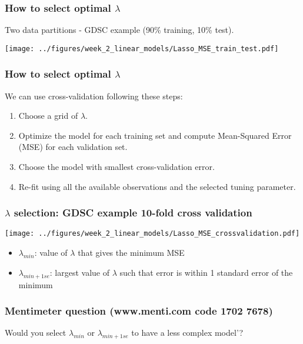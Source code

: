 \documentclass[notes]{beamer}          %
\begin{document}
\begin{frame}
\frametitle{How to select optimal $\lambda$}

Two data partitions - GDSC example (90\% training, 10\% test).

\begin{center}
\texttt{[image: ../figures/week\_2\_linear\_models/Lasso\_MSE\_train\_test.pdf]}
\end{center}
\end{frame}

\begin{frame}
\frametitle{How to select optimal $\lambda$}

We can use cross-validation following these steps:
\begin{enumerate}
  \item Choose a grid of $\lambda$.
  \item Optimize the model for each training set and compute Mean-Squared Error (MSE) for each validation set.
  \item Choose the model with smallest cross-validation error.
  \item Re-fit using all the available observations and the selected tuning parameter.
\end{enumerate}

\end{frame}

\begin{frame}
\frametitle{$\lambda$ selection: GDSC example 10-fold cross validation}

\begin{center}
\texttt{[image: ../figures/week\_2\_linear\_models/Lasso\_MSE\_crossvalidation.pdf]}
\end{center}

\vspace{-2mm} 

\begin{itemize}
    \item $\lambda_{min}$: value of $\lambda$ that gives the minimum MSE
    \item $\lambda_{min+1se}$: largest value of $\lambda$ such that error is within 1 standard error of the minimum
\end{itemize}

\end{frame}

\begin{frame}
\frametitle{Mentimeter question (www.menti.com code 1702 7678)}

Would you select $\lambda_{min}$ or $\lambda_{min+1se}$ to have a less complex model'?

\end{frame}
\end{document}
